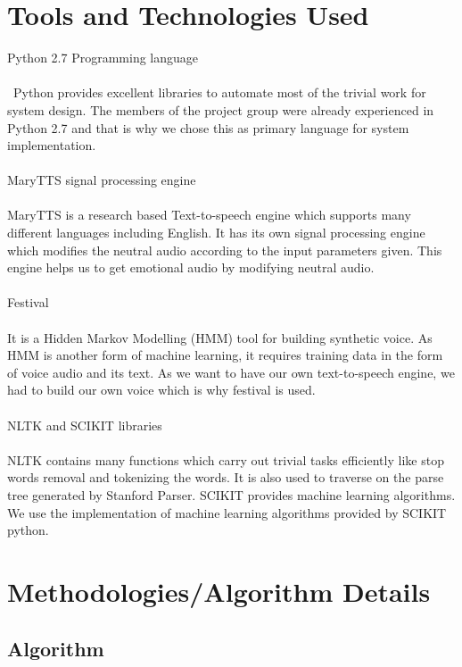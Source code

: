 \documentclass[oneside,a4paper,12pt]{book}
\begin{document}
  \section{Tools and Technologies Used}
   Python 2.7 Programming language\\\\\
   Python provides excellent libraries to automate most of the trivial work for system design. The members of the project group were already experienced in Python 2.7 and that is why we chose this as primary language for system implementation.\\\\
   MaryTTS signal processing engine\\\\
  	 MaryTTS is a research based Text-to-speech engine which supports many different languages including English. It has its own signal processing engine which modifies the neutral audio according to the input parameters given.
  	 This engine helps us to get emotional audio by modifying neutral audio.\\\\
  	 Festival\\\\
  	 It is a Hidden Markov Modelling (HMM) tool for building synthetic voice. As HMM is another form of machine learning, it requires training data in the form of voice audio and its text. As we want to have our own text-to-speech engine, we had to build our own voice which is why festival is used.\\\\
  	 NLTK and SCIKIT libraries\\\\
  	 NLTK contains many functions which carry out trivial tasks efficiently like stop words removal and tokenizing the words. It is also used to traverse on the parse tree generated by Stanford Parser. SCIKIT provides machine learning algorithms. We use the implementation of machine learning algorithms provided by SCIKIT python.
  	 
  \section{Methodologies/Algorithm Details}
  \subsection{Algorithm}
\end{document}
